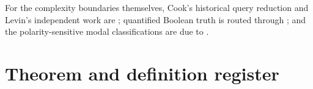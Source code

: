 For the complexity boundaries themselves, Cook's historical query reduction
and Levin's independent work are \textcite{Cook1971,Levin1973}; quantified
Boolean truth is routed through
\textcite{StockmeyerMeyer1973,Papadimitriou1994}; and the polarity-sensitive
modal classifications are due to \textcite{Ladner1977}.

\section{Theorem and definition register}
\label{sec:p09-theorem-definition-register}


